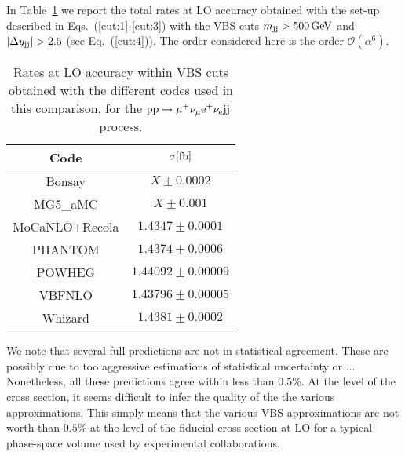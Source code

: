 In Table~\ref{tab:wg1_LOrates} we report the total rates at LO accuracy obtained with the set-up described in Eqs.~(\ref{cut:1}-\ref{cut:3}) with the VBS cuts $m_{\text{j}\text{j}} > 500 \,\text{GeV}$ and $|\Delta y_{\text{j}\text{j}}| > 2.5$ (see Eq.~(\ref{cut:4})).
The order considered here is the order $\mathcal{O}(\alpha^6)$.

\begin{table}[h!]
    \centering
    \begin{tabular}{c|c}
        Code  &  $\sigma[\rm{fb}]$  \\
        \hline
        \hline
        {\sc Bonsay}  &  $X \pm 0.0002$ \\
        {\sc MG5\_aMC}&  $X \pm 0.001$  \\
        {\sc MoCaNLO+Recola}  &  $1.4347 \pm 0.0001$ \\
        {\sc PHANTOM} &  $1.4374 \pm 0.0006 $  \\
        {\sc POWHEG}  &  $1.44092 \pm 0.00009$ \\
        {\sc VBFNLO}  &  $1.43796 \pm 0.00005$ \\
        {\sc Whizard} &  $1.4381 \pm 0.0002 $
    \end{tabular}
    \caption{\label{tab:wg1_LOrates} Rates at LO accuracy within VBS cuts obtained with the different codes used in this comparison,
    for the ${\rm p}{\rm p}\to\mu^+\nu_\mu{\rm e}^+\nu_{\rm e}{\rm j}{\rm j}$ process.
    }
\end{table}

We note that several full predictions are not in statistical agreement.
These are possibly due to too aggressive estimations of statistical uncertainty or ... 
Nonetheless, all these predictions agree within less than $0.5\%$.
At the level of the cross section, it seems difficult to infer the quality of the the various approximations.
This simply means that the various VBS approximations are not worth than $0.5\%$ at the level of the fiducial cross section at LO for a typical phase-space volume used by experimental collaborations.